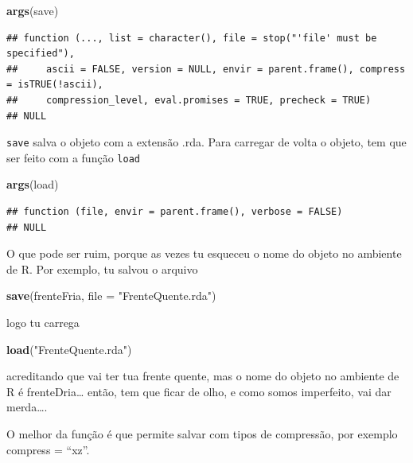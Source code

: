 \documentclass[]{book}
\newenvironment{Shaded}{\begin{snugshade}}{\end{snugshade}}
\newcommand{\KeywordTok}[1]{\textcolor[rgb]{0.13,0.29,0.53}{\textbf{#1}}}
\newcommand{\DataTypeTok}[1]{\textcolor[rgb]{0.13,0.29,0.53}{#1}}
\newcommand{\StringTok}[1]{\textcolor[rgb]{0.31,0.60,0.02}{#1}}
\newcommand{\NormalTok}[1]{#1}
\theoremstyle{definition}
\theoremstyle{definition}
\theoremstyle{definition}
\theoremstyle{remark}
\begin{document}
\begin{Shaded}
\begin{Highlighting}[]
\KeywordTok{args}\NormalTok{(save)}
\end{Highlighting}
\end{Shaded}

\begin{verbatim}
## function (..., list = character(), file = stop("'file' must be specified"), 
##     ascii = FALSE, version = NULL, envir = parent.frame(), compress = isTRUE(!ascii), 
##     compression_level, eval.promises = TRUE, precheck = TRUE) 
## NULL
\end{verbatim}

\texttt{save} salva o objeto com a extensão .rda. Para carregar de volta
o objeto, tem que ser feito com a função \texttt{load}

\begin{Shaded}
\begin{Highlighting}[]
\KeywordTok{args}\NormalTok{(load)}
\end{Highlighting}
\end{Shaded}

\begin{verbatim}
## function (file, envir = parent.frame(), verbose = FALSE) 
## NULL
\end{verbatim}

O que pode ser ruim, porque as vezes tu esqueceu o nome do objeto no
ambiente de R. Por exemplo, tu salvou o arquivo

\begin{Shaded}
\begin{Highlighting}[]
\KeywordTok{save}\NormalTok{(frenteFria, }\DataTypeTok{file =} \StringTok{"FrenteQuente.rda"}\NormalTok{)}
\end{Highlighting}
\end{Shaded}

logo tu carrega

\begin{Shaded}
\begin{Highlighting}[]
\KeywordTok{load}\NormalTok{(}\StringTok{"FrenteQuente.rda"}\NormalTok{)}
\end{Highlighting}
\end{Shaded}

acreditando que vai ter tua frente quente, mas o nome do objeto no
ambiente de R é frenteDria\ldots{} então, tem que ficar de olho, e como
somos imperfeito, vai dar merda\ldots{}.

O melhor da função é que permite salvar com tipos de compressão, por
exemplo compress = ``xz''.
\end{document}
